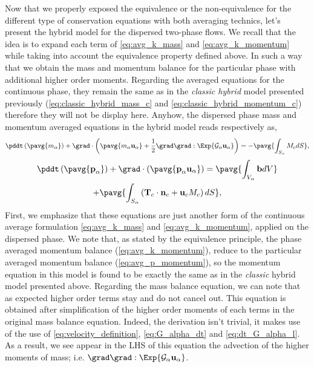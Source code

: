 Now that we properly exposed the equivalence or the non-equivalence for the different type of conservation equations with both averaging technics, let's present the hybrid model for the dispersed two-phase flows. 
We recall that the idea is to expand each term of \ref{eq:avg_k_mass} and \ref{eq:avg_k_momentum} while taking into account the equivalence property defined above.
In such a way that we obtain the mass and momentum balance for the particular phase with additional higher order moments. 
Regarding the averaged equations for the continuous phase, they remain the same as in the \textit{classic hybrid} model presented previously (\ref{eq:classic_hybrid_mass_c} and \ref{eq:classic_hybrid_momentum_c}) therefore they will not be display here.
Anyhow, the dispersed phase mass and momentum averaged equations in the hybrid model reads respectively as, 
\begin{equation}
    \pddt   \left(\pavg{m_\alpha}\right)
    + \grad \cdot \left(\pavg{m_\alpha \textbf{u}_\alpha} 
    + \frac{1}{2}\grad\grad : \Exp{ \mathcal{G}_\alpha\textbf{u}_\alpha}\right) 
    = -\pavg{\int_{S_\alpha} M_c d S},
        \label{eq:hybrid_mass_p}
\end{equation}
\begin{multline}
    \pddt   \left(\pavg{\textbf{p}_\alpha}\right)
    + \grad \cdot (\pavg{\textbf{p}_\alpha \textbf{u}_\alpha})
    = \pavg{\int_{V_\alpha} \textbf{b} dV}\\
    + \pavg{\int_{S_\alpha} \left(\textbf{T}_c  \cdot \textbf{n}_c  + \textbf{u}_c M_c \right) dS},
    \label{eq:hybrid_momentum_p}
\end{multline}
First, we emphasize that these equations are just another form of the continuous average formulation \ref{eq:avg_k_mass} and \ref{eq:avg_k_momentum}, applied on the dispersed phase. 
We note that, as stated by the equivalence principle, the phase averaged momentum balance (\ref{eq:avg_k_momentum}), reduce to the particular averaged momentum balance (\ref{eq:avg_p_momentum}), so the momentum equation in this model is found to be exactly the same as in the \textit{classic} hybrid model presented above. 
Regarding the mass balance equation, we can note that as expected higher order terms stay and do not cancel out.
This equation is obtained after simplification of the higher order moments of each terms in the original mass balance equation. 
Indeed, the derivation isn't trivial, it makes use of the use of \ref{eq:velocity_definition}, \ref{eq:G_alpha_dt} and \ref{eq:dt_G_alpha_l}.
As a result, we see appear in the LHS of this equation the advection of the higher moments of mass; i.e. $\grad \grad : \Exp{ \mathcal{G}_\alpha\textbf{u}_\alpha}$. 
